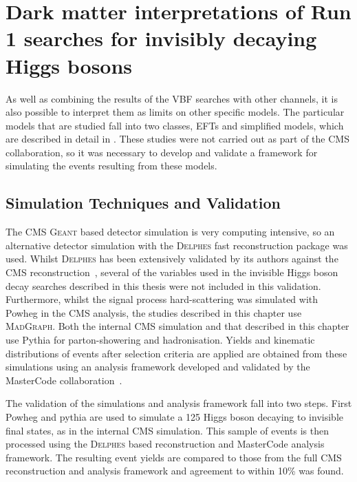 \chapter{Dark matter interpretations of Run 1 searches for invisibly decaying Higgs bosons}
\label{chap:interp}
As well as combining the results of the \ac{VBF} searches with other channels, it is also possible to interpret them as limits on other specific models. The particular models that are studied fall into two classes, \ac{EFT}s and simplified models, which are described in detail in . These studies were not carried out as part of the CMS collaboration, so it was necessary to develop and validate a framework for simulating the events resulting from these models.


\section{Simulation Techniques and Validation}
\label{sec:dmval}
The CMS \textsc{Geant} based detector simulation is very computing intensive, so an alternative detector simulation with the \textsc{Delphes} fast reconstruction package was used. Whilst \textsc{Delphes} has been extensively validated by its authors against the CMS reconstruction~\cite{Favereau2014}, several of the variables used in the invisible Higgs boson decay searches described in this thesis were not included in this validation. Furthermore, whilst the signal process hard-scattering was simulated with Powheg in the CMS analysis, the studies described in this chapter use \textsc{MadGraph}. Both the internal CMS simulation and that described in this chapter use Pythia for parton-showering and hadronisation. Yields and kinematic distributions of events after selection criteria are applied are obtained from these simulations using an analysis framework developed and validated by the MasterCode collaboration~\cite{deVries:2015hva}.

The validation of the simulations and analysis framework fall into two steps. First Powheg and pythia are used to simulate a 125 \GeV Higgs boson decaying to invisible final states, as in the internal CMS simulation. This sample of events is then processed using the \textsc{Delphes} based reconstruction and MasterCode analysis framework.
The resulting event yields are compared to those from the full CMS reconstruction and analysis framework and agreement to within 10\% was found.


